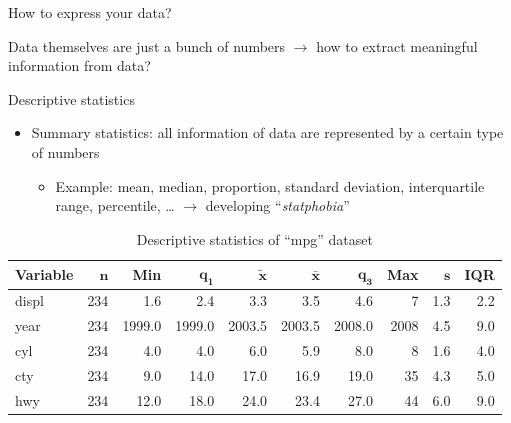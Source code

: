 \documentclass[9pt,ignorenonframetext,xcolor=dvipsnames]{beamer}
\providecommand{\tightlist}{%
  \setlength{\itemsep}{0pt}\setlength{\parskip}{0pt}}
\newlength{\wideitemsep}
\let\olditem\item
\renewcommand{\item}{\setlength{\itemsep}{\wideitemsep}\olditem}
\begin{document}
\begin{frame}{How to express your data?}

\begin{mdframed}[backgroundcolor = gray!30]
Data themselves are just a bunch of numbers $\rightarrow$ how to extract meaningful information from data?
\end{mdframed}

\begin{block}{Descriptive statistics}

\begin{itemize}
\tightlist
\item
  Summary statistics: all information of data are represented by a
  certain type of numbers

  \begin{itemize}
  \tightlist
  \item
    Example: mean, median, proportion, standard deviation, interquartile
    range, percentile, \ldots{} \(\rightarrow\) developing
    ``\textit{statphobia}''
  \end{itemize}
\end{itemize}

\begin{table}[H]
\centering
\caption{Descriptive statistics of ``mpg'' dataset} 
\label{tab:demo-1}
\begingroup\footnotesize
\begin{tabular}{lrrrrrrrrr}
 \textbf{Variable} & $\mathbf{n}$ & \textbf{Min} & $\mathbf{q_1}$ & $\mathbf{\widetilde{x}}$ & $\mathbf{\bar{x}}$ & $\mathbf{q_3}$ & \textbf{Max} & $\mathbf{s}$ & \textbf{IQR} \\ 
  \hline
displ & 234 &    1.6 &    2.4 &    3.3 &    3.5 &    4.6 &    7 & 1.3 & 2.2 \\ 
  year & 234 & 1999.0 & 1999.0 & 2003.5 & 2003.5 & 2008.0 & 2008 & 4.5 & 9.0 \\ 
  cyl & 234 &    4.0 &    4.0 &    6.0 &    5.9 &    8.0 &    8 & 1.6 & 4.0 \\ 
  cty & 234 &    9.0 &   14.0 &   17.0 &   16.9 &   19.0 &   35 & 4.3 & 5.0 \\ 
  hwy & 234 &   12.0 &   18.0 &   24.0 &   23.4 &   27.0 &   44 & 6.0 & 9.0 \\ 
  \end{tabular}
\endgroup
\end{table}

\end{block}

\end{frame}
\end{document}

